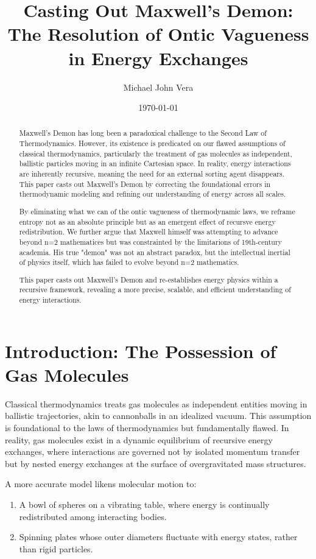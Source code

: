 \documentclass[12pt]{article}
\title{Casting Out Maxwell's Demon: The Resolution of Ontic Vagueness in Energy Exchanges}
\author{Michael John Vera}
\date{\today}
\begin{document}
\maketitle

\begin{abstract}
Maxwell’s Demon has long been a paradoxical challenge to the Second Law of Thermodynamics. However, its existence is predicated on our flawed assumptions of classical thermodynamics, particularly the treatment of gas molecules as independent, ballistic particles moving in an infinite Cartesian space. In reality, energy interactions are inherently recursive, meaning the need for an external sorting agent disappears. This paper casts out Maxwell’s Demon by correcting the foundational errors in thermodynamic modeling and refining our understanding of energy across all scales.

By eliminating what we can of the ontic vagueness of thermodynamic laws, we reframe entropy not as an absolute principle but as an emergent effect of recursve energy redistribution. We further argue that Maxwell himself was attempting to advance beyond n=2 mathematices but was constrainted by the limitarions of 19th-century academia. His true "demon" was not an abstract paradox, but the intellectual inertial of physics itself, which has failed to evolve beyond n=2 mathematics.

This paper casts out Maxwell’s Demon and re-establishes energy physics within a recursive framework, revealing a more precise, scalable, and efficient understanding of energy interactions.

\end{abstract}

\section{Introduction: The Possession of Gas Molecules}
Classical thermodynamics treats gas molecules as independent entities moving in ballistic trajectories, akin to cannonballs in an idealized vacuum. This assumption is foundational to the laws of thermodynamics but fundamentally flawed. In reality, gas molecules exist in a dynamic equilibrium of recursive energy exchanges, where interactions are governed not by isolated momentum transfer but by nested energy exchanges at the surface of overgravitated mass structures.

A more accurate model likens molecular motion to:
\begin{enumerate}
    \item A bowl of spheres on a vibrating table, where energy is continually redistributed among interacting bodies.
    \item Spinning plates whose outer diameters fluctuate with energy states, rather than rigid particles.
\end{enumerate}
\end{document}
